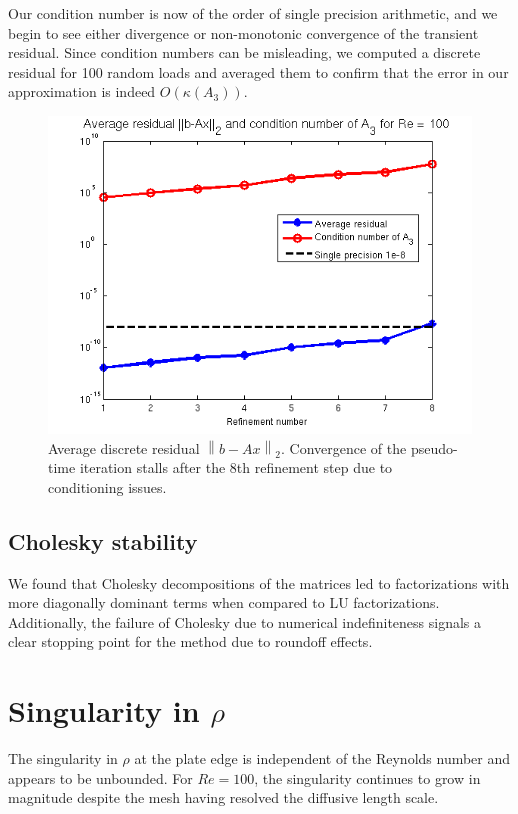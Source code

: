 \documentclass[11pt,onecolumn]{scrartcl}
\newcommand{\nor}[1]{\left\| #1 \right\|}
\begin{document}
Our condition number is now of the order of single precision arithmetic, and we begin to see either divergence or non-monotonic convergence of the transient residual.  Since condition numbers can be misleading, we computed a discrete residual for 100 random loads and averaged them to confirm that the error in our approximation is indeed $O(\kappa(A_3))$.  

\begin{figure}[!h]
\centering
\includegraphics[scale=.8]{figs/NSResidualCondition.png}
\caption{Average discrete residual $\nor{b-Ax}_2$.  Convergence of the pseudo-time iteration stalls after the 8th refinement step due to conditioning issues.}
\end{figure}

\subsection{ Cholesky stability}

We found that Cholesky decompositions of the matrices led to factorizations with more diagonally dominant terms when compared to LU factorizations.  Additionally, the failure of Cholesky due to numerical indefiniteness signals a clear stopping point for the method due to roundoff effects.  

\section{Singularity in $\rho$}

The singularity in $\rho$ at the plate edge is independent of the Reynolds number and appears to be unbounded.  For $Re = 100$, the singularity continues to grow in magnitude despite the mesh having resolved the diffusive length scale.  
\end{document}

